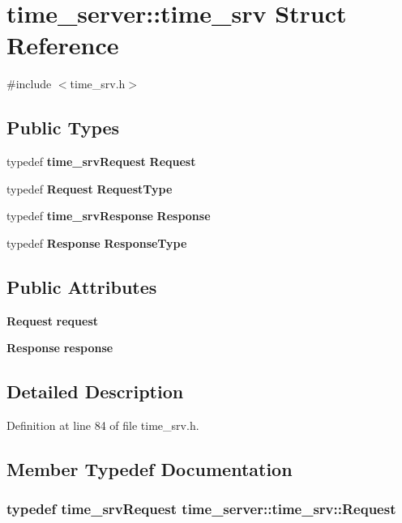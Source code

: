 \section{time\-\_\-server\-:\-:time\-\_\-srv \-Struct \-Reference}
\label{structtime__server_1_1time__srv}


{\ttfamily \#include $<$time\-\_\-srv.\-h$>$}

\subsection*{\-Public \-Types}
\begin{DoxyCompactItemize}
\item 
typedef {\bf time\-\_\-srv\-Request} {\bf \-Request}
\item 
typedef {\bf \-Request} {\bf \-Request\-Type}
\item 
typedef {\bf time\-\_\-srv\-Response} {\bf \-Response}
\item 
typedef {\bf \-Response} {\bf \-Response\-Type}
\end{DoxyCompactItemize}
\subsection*{\-Public \-Attributes}
\begin{DoxyCompactItemize}
\item 
{\bf \-Request} {\bf request}
\item 
{\bf \-Response} {\bf response}
\end{DoxyCompactItemize}


\subsection{\-Detailed \-Description}


\-Definition at line 84 of file time\-\_\-srv.\-h.



\subsection{\-Member \-Typedef \-Documentation}
\subsubsection[{\-Request}]{\setlength{\rightskip}{0pt plus 5cm}typedef {\bf time\-\_\-srv\-Request} {\bf time\-\_\-server\-::time\-\_\-srv\-::\-Request}}\label{structtime__server_1_1time__srv_ac237158b7352a88b14cd5373bbdebe68}


